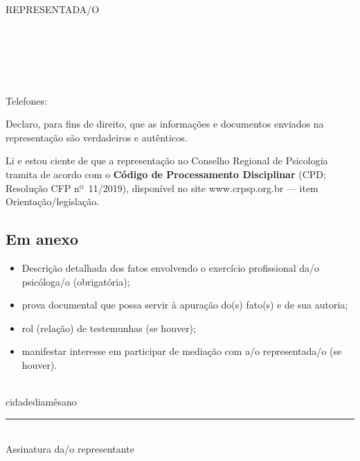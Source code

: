 \documentclass[openright, oneside, a4paper, article, brazil]{abntex2}
\begin{document}
\begin{framed}%
	\noindent
	\begin{minipage}{\linewidth}
		\noindent REPRESENTADA/O
		\vspace*{0.5\baselineskip}

			\begin{minipage}{\linewidth}
		\\
		\\
		\\
		 \hfill%
		 \hfill%
		\\
		 \hfill%
		\\
Telefones: \hfill
{} \hfill%
 \hfill%
\\
	\end{minipage}
	\end{minipage}
\end{framed}

Declaro, para fins de direito, que as informações e documentos enviados na representação são verdadeiros e autênticos.

Li e estou ciente de que a representação no Conselho Regional de Psicologia tramita de acordo com o \textbf{Código de Processamento Disciplinar} (CPD; Resolução CFP nº~11/2019), disponível no site www.crpsp.org.br --- item Orientação/legislação.

\subsection{Em anexo}

\begin{itemize}
	\item Descrição detalhada dos fatos envolvendo o exercício profissional da/o psicóloga/o	(obrigatória);
	\item prova documental que possa servir à apuração do(s) fato(s) e de sua autoria;
	\item rol (relação) de testemunhas (se houver);
	\item manifestar interesse em participar de mediação com a/o representada/o (se houver).
\end{itemize}
\vspace{2\baselineskip}

\\\vspace{-1ex}
\small\hspace{8.6em}cidade\hspace{11em}dia\hspace{7em}mês\hspace{7.15em}ano
\vspace{3.5\baselineskip}

\rule{20em}{0.4pt}\\
\small Assinatura da/o representante
\end{document}
